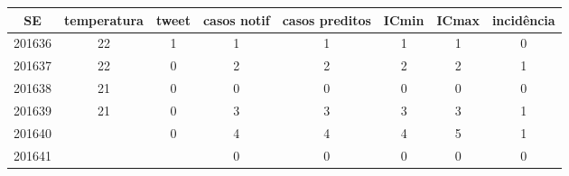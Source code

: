 \begin{tabular}{c|ccccccc}
  \hline
SE & temperatura & tweet & casos notif & casos preditos & ICmin & ICmax & incidência \\ 
  \hline
201636 & 22 & 1 & 1 & 1 & 1 & 1 & 0 \\ 
  201637 & 22 & 0 & 2 & 2 & 2 & 2 & 1 \\ 
  201638 & 21 & 0 & 0 & 0 & 0 & 0 & 0 \\ 
  201639 & 21 & 0 & 3 & 3 & 3 & 3 & 1 \\ 
  201640 &  & 0 & 4 & 4 & 4 & 5 & 1 \\ 
  201641 &  &  & 0 & 0 & 0 & 0 & 0 \\ 
   \hline
\end{tabular}
